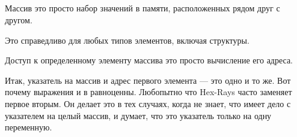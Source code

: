 ﻿\subsection{\Conclusion{}}

Массив это просто набор значений в памяти, расположенных рядом друг с другом.

Это справедливо для любых типов элементов, включая структуры.

Доступ к определенному элементу массива это просто вычисление его адреса.

Итак, указатель на массив и адрес первого элемента --- это одно и то же.
Вот почему выражения  и  в \CCpp равноценны.
Любопытно что Hex-Rays часто заменяет первое вторым.
Он делает это в тех случаях, когда не знает, что имеет дело с указателем на целый массив,
и думает, что это указатель только на одну переменную.

